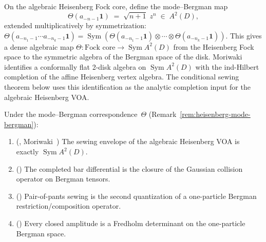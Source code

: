 \begin{remark}%
\label{rem:heisenberg-mode-bergman}%
%
%
On the algebraic Heisenberg Fock core, define the mode--Bergman map
\[
\Theta(a_{-n-1}\mathbf{1})
\;=\;
\sqrt{n{+}1}\; z^n
\;\in\; A^2(D),
\]
extended multiplicatively by symmetrization:
$\Theta(a_{-n_1-1} \cdots a_{-n_k-1}\mathbf{1})
= \operatorname{Sym}(\Theta(a_{-n_1-1}\mathbf{1}) \otimes
\cdots \otimes \Theta(a_{-n_k-1}\mathbf{1}))$.
This gives a dense algebraic map
$\Theta \colon \text{Fock core} \to
\operatorname{Sym} A^2(D)$
from the Heisenberg Fock space to the symmetric algebra of the
Bergman space of the disk.
Moriwaki~\cite{Moriwaki26b} identifies a conformally flat 2-disk
algebra on $\operatorname{Sym} A^2(D)$ with the ind-Hilbert completion
of the affine Heisenberg vertex algebra. The conditional sewing
theorem below uses this identification as the analytic completion
input for the algebraic Heisenberg VOA.
\end{remark}

\begin{theorem}\label{thm:heisenberg-sewing-vol1}%
%
Under the mode--Bergman correspondence~$\Theta$
\textup{(}Remark~\textup{\ref{rem:heisenberg-mode-bergman}}\textup{)}:
\begin{enumerate}[label=\textup{(\roman*)}]
\item \textup{(\ClaimStatusProvedElsewhere, Moriwaki~\cite{Moriwaki26b})}
 The sewing envelope of the algebraic Heisenberg VOA is exactly
 $\operatorname{Sym} A^2(D)$.
\item \textup{(\ClaimStatusProvedHere)}
 The completed bar differential is the closure of the Gaussian
 collision operator on Bergman tensors.
\item \textup{(\ClaimStatusProvedHere)}
 Pair-of-pants sewing is the second quantization of a
 one-particle Bergman restriction/composition operator.
\item \textup{(\ClaimStatusProvedHere)}
 Every closed amplitude is a Fredholm determinant on the
 one-particle Bergman space.
\end{enumerate}
\end{theorem}

